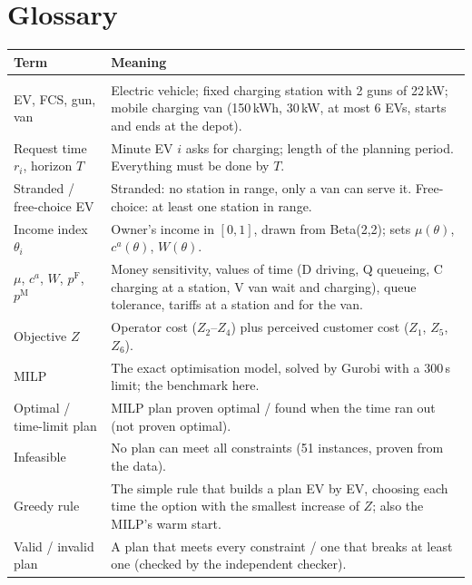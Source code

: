 \documentclass[11pt,a4paper]{article}
\begin{document}
\tableofcontents
\newpage

\section{Glossary}
\label{sec:glossary}

\begin{xltabular}{\textwidth}{@{}>{\raggedright\arraybackslash}p{4.0cm}X@{}}
\toprule
\textbf{Term} & \textbf{Meaning} \\
\midrule
\endhead
{} \\
EV, FCS, gun, van & Electric vehicle; fixed charging station with 2 guns of 22\,kW; mobile charging van (150\,kWh, 30\,kW, at most 6 EVs, starts and ends at the depot). \\
Request time $r_i$, horizon $T$ & Minute EV $i$ asks for charging; length of the planning period. Everything must be done by $T$. \\
Stranded / free-choice EV & Stranded: no station in range, only a van can serve it. Free-choice: at least one station in range. \\
Income index $\theta_i$ & Owner's income in $[0,1]$, drawn from Beta(2,2); sets $\mu(\theta)$, $c^{a}(\theta)$, $W(\theta)$. \\
$\mu$, $c^{a}$, $W$, $p^{\mathrm F}$, $p^{\mathrm M}$ & Money sensitivity, values of time (D driving, Q queueing, C charging at a station, V van wait and charging), queue tolerance, tariffs at a station and for the van. \\
Objective $Z$ & Operator cost ($Z_2$--$Z_4$) plus perceived customer cost ($Z_1$, $Z_5$, $Z_6$). \\
MILP & The exact optimisation model, solved by Gurobi with a 300\,s limit; the benchmark here. \\
Optimal / time-limit plan & MILP plan proven optimal / found when the time ran out (not proven optimal). \\
Infeasible & No plan can meet all constraints (51 instances, proven from the data). \\
Greedy rule & The simple rule that builds a plan EV by EV, choosing each time the option with the smallest increase of $Z$; also the MILP's warm start. \\
Valid / invalid plan & A plan that meets every constraint / one that breaks at least one (checked by the independent checker). \\

\end{xltabular}
\end{document}
